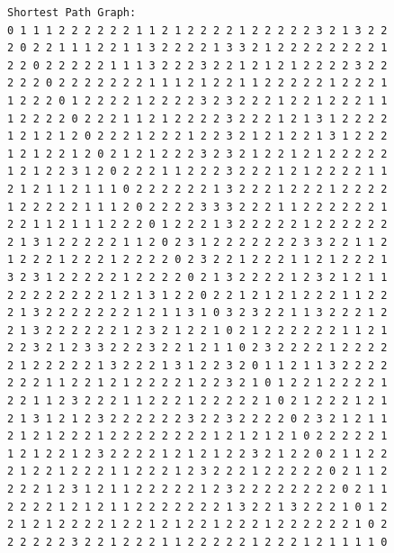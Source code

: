 \documentclass[11pt]{article}
\begin{document}
\begin{lstlisting}
Shortest Path Graph:
0 1 1 1 2 2 2 2 2 2 1 1 2 1 2 2 2 2 1 2 2 2 2 2 3 2 1 3 2 2
2 0 2 2 1 1 1 2 2 1 1 3 2 2 2 2 1 3 3 2 1 2 2 2 2 2 2 2 2 1
2 2 0 2 2 2 2 2 1 1 1 3 2 2 2 3 2 2 1 2 1 2 1 2 2 2 2 3 2 2
2 2 2 0 2 2 2 2 2 2 2 1 1 1 2 1 2 2 1 1 2 2 2 2 2 1 2 2 2 1
1 2 2 2 0 1 2 2 2 2 1 2 2 2 2 3 2 3 2 2 2 1 2 2 1 2 2 2 1 1
1 2 2 2 2 0 2 2 2 1 1 2 1 2 2 2 2 3 2 2 2 1 2 1 3 1 2 2 2 2
1 2 1 2 1 2 0 2 2 2 1 2 2 2 1 2 2 3 2 1 2 1 2 2 1 3 1 2 2 2
1 2 1 2 2 1 2 0 2 1 2 1 2 2 2 3 2 3 2 1 2 2 1 2 1 2 2 2 2 2
1 2 1 2 2 3 1 2 0 2 2 2 1 1 2 2 2 3 2 2 2 1 2 1 2 2 2 2 1 1
2 1 2 1 1 2 1 1 1 0 2 2 2 2 2 2 1 3 2 2 2 1 2 2 2 1 2 2 2 2
1 2 2 2 2 2 1 1 1 2 0 2 2 2 2 3 3 3 2 2 2 1 1 2 2 2 2 2 2 1
2 2 1 1 2 1 1 1 2 2 2 0 1 2 2 2 1 3 2 2 2 2 2 1 2 2 2 2 2 2
2 1 3 1 2 2 2 2 2 1 1 2 0 2 3 1 2 2 2 2 2 2 2 3 3 2 2 1 1 2
1 2 2 2 1 2 2 2 1 2 2 2 2 0 2 3 2 2 1 2 2 2 1 1 2 1 2 2 2 1
3 2 3 1 2 2 2 2 2 1 2 2 2 2 0 2 1 3 2 2 2 2 1 2 3 2 1 2 1 1
2 2 2 2 2 2 2 2 1 2 1 3 1 2 2 0 2 2 1 2 1 2 1 2 2 2 1 1 2 2
2 1 3 2 2 2 2 2 2 2 1 2 1 1 3 1 0 3 2 3 2 2 1 1 3 2 2 2 1 2
2 1 3 2 2 2 2 2 2 1 2 3 2 1 2 2 1 0 2 1 2 2 2 2 2 2 1 1 2 1
2 2 3 2 1 2 3 3 2 2 2 3 2 2 1 2 1 1 0 2 3 2 2 2 2 1 2 2 2 2
2 1 2 2 2 2 2 1 3 2 2 2 1 3 1 2 2 3 2 0 1 1 2 1 1 3 2 2 2 2
2 2 2 1 1 2 2 1 2 1 2 2 2 2 1 2 2 3 2 1 0 1 2 2 1 2 2 2 2 1
2 2 1 1 2 3 2 2 2 1 1 2 2 2 1 2 2 2 2 2 1 0 2 1 2 2 2 1 2 1
2 1 3 1 2 1 2 3 2 2 2 2 2 2 3 2 2 3 2 2 2 2 0 2 3 2 1 2 1 1
2 1 2 1 2 2 2 1 2 2 2 2 2 2 2 2 1 2 1 2 1 2 1 0 2 2 2 2 2 1
1 2 1 2 2 1 2 3 2 2 2 2 1 2 1 2 1 2 2 3 2 1 2 2 0 2 1 1 2 2
2 1 2 2 1 2 2 2 1 1 2 2 2 1 2 3 2 2 2 1 2 2 2 2 2 0 2 1 1 2
2 2 2 1 2 3 1 2 1 1 2 2 2 2 2 1 2 3 2 2 2 2 2 2 2 2 0 2 1 1
2 2 2 2 1 2 1 2 1 1 2 2 2 2 2 2 2 1 3 2 2 1 3 2 2 2 1 0 1 2
2 1 2 1 2 2 2 2 1 2 2 1 2 1 2 2 1 2 2 2 1 2 2 2 2 2 2 1 0 2
2 2 2 2 2 3 2 2 1 2 2 2 1 1 2 2 2 2 2 1 2 2 2 1 2 1 1 1 1 0


\end{lstlisting}
\end{document}
